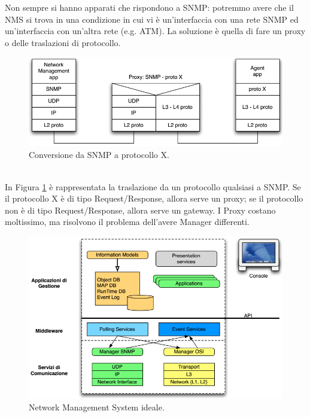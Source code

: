 Non sempre si hanno apparati che rispondono a SNMP: potremmo avere che il NMS si trova in una condizione in cui vi è un'interfaccia con una rete SNMP ed un'interfaccia con un'altra rete (e.g. ATM). La soluzione è quella di fare un proxy o delle traslazioni di protocollo.
\begin{figure}[htbp]
	\centering
	\includegraphics[scale = 0.55]{images/multiprotocol}
	\caption{Conversione da SNMP a protocollo X.}
	\label{img:multiprotocol}
\end{figure}\\
In Figura \ref{img:multiprotocol} è rappresentata la traslazione da un protocollo qualsiasi a SNMP. Se il protocollo X è di tipo Request/Response, allora serve un proxy; se il protocollo non è di tipo Request/Response, allora serve un gateway. I Proxy costano moltissimo, ma risolvono il problema dell'avere Manager differenti.
\begin{figure}[htbp]
	\centering
	\includegraphics[scale = 0.55]{images/Ideal-Network-Management-System}
	\caption{Network Management System ideale.}
	\label{img:Ideal-Network-Management-System}
\end{figure}\\
